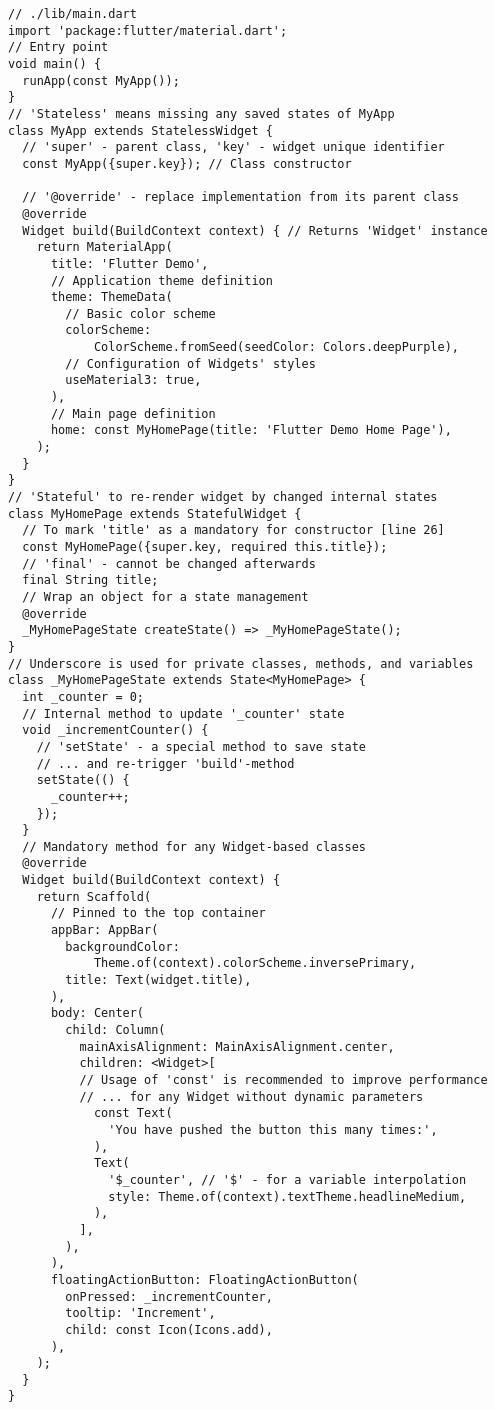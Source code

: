 \begin{lstlisting}
// ./lib/main.dart
import 'package:flutter/material.dart';
// Entry point
void main() {
  runApp(const MyApp());
}
// 'Stateless' means missing any saved states of MyApp
class MyApp extends StatelessWidget {
  // 'super' - parent class, 'key' - widget unique identifier
  const MyApp({super.key}); // Class constructor
  
  // '@override' - replace implementation from its parent class
  @override
  Widget build(BuildContext context) { // Returns 'Widget' instance
    return MaterialApp(
      title: 'Flutter Demo',
      // Application theme definition
      theme: ThemeData(
        // Basic color scheme
        colorScheme:
            ColorScheme.fromSeed(seedColor: Colors.deepPurple),
        // Configuration of Widgets' styles
        useMaterial3: true,
      ),
      // Main page definition
      home: const MyHomePage(title: 'Flutter Demo Home Page'),
    );
  }
}
// 'Stateful' to re-render widget by changed internal states
class MyHomePage extends StatefulWidget {
  // To mark 'title' as a mandatory for constructor [line 26]
  const MyHomePage({super.key, required this.title});
  // 'final' - cannot be changed afterwards
  final String title;
  // Wrap an object for a state management
  @override
  _MyHomePageState createState() => _MyHomePageState();
}
// Underscore is used for private classes, methods, and variables
class _MyHomePageState extends State<MyHomePage> {
  int _counter = 0;
  // Internal method to update '_counter' state
  void _incrementCounter() {
    // 'setState' - a special method to save state
    // ... and re-trigger 'build'-method
    setState(() {
      _counter++;
    });
  }
  // Mandatory method for any Widget-based classes
  @override
  Widget build(BuildContext context) {
    return Scaffold(
      // Pinned to the top container
      appBar: AppBar(
        backgroundColor:
            Theme.of(context).colorScheme.inversePrimary,
        title: Text(widget.title),
      ),
      body: Center(
        child: Column(
          mainAxisAlignment: MainAxisAlignment.center,
          children: <Widget>[
          // Usage of 'const' is recommended to improve performance
          // ... for any Widget without dynamic parameters
            const Text(
              'You have pushed the button this many times:',
            ),
            Text(
              '$_counter', // '$' - for a variable interpolation
              style: Theme.of(context).textTheme.headlineMedium,
            ),
          ],
        ),
      ),
      floatingActionButton: FloatingActionButton(
        onPressed: _incrementCounter,
        tooltip: 'Increment',
        child: const Icon(Icons.add),
      ),
    );
  }
}
\end{lstlisting}

